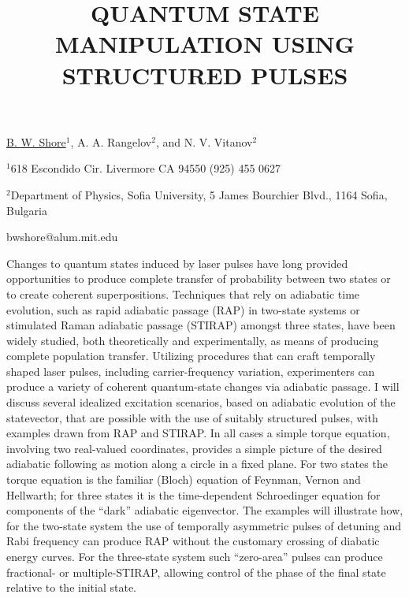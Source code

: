 \title{QUANTUM STATE MANIPULATION USING STRUCTURED PULSES}

\underline{B. W. Shore}$^1$, A. A. Rangelov$^2$, and N. V.
Vitanov$^{2}$   

{\normalsize{\vspace{-4mm} $^1$618 Escondido Cir. Livermore CA 94550 (925) 455
0627

\vspace{-4mm}  $^2$Department of Physics, Sofia University, 5 James
Bourchier Blvd., 1164 Sofia, Bulgaria

\email bwshore@alum.mit.edu}}

Changes to quantum states induced by laser pulses have long provided
opportunities to produce complete transfer of probability between two
states or to create coherent superpositions. Techniques that rely on
adiabatic time evolution, such as rapid adiabatic passage (RAP) in two-state
systems or stimulated Raman adiabatic passage (STIRAP)  amongst
three states, have been widely studied, both theoretically and
experimentally, as means of producing complete population transfer.
Utilizing procedures that can craft temporally shaped laser pulses,
including carrier-frequency variation,  experimenters can produce a
variety of coherent quantum-state changes via adiabatic passage.  I
will discuss several idealized excitation scenarios, based on
adiabatic evolution of the statevector,  that are possible with the
use of suitably structured pulses, with examples drawn from RAP and
STIRAP.  In all cases a simple torque equation, involving two real-valued
coordinates,  provides a simple picture of the desired
adiabatic following as motion along a circle in a fixed plane. For two
states the torque equation is the familiar (Bloch) equation of
Feynman, Vernon and Hellwarth; for three states it is the time-dependent
Schroedinger equation for components of the ``dark'' adiabatic
eigenvector.  The examples will illustrate how, for the two-state
system the use of temporally asymmetric pulses of detuning and Rabi
frequency can produce RAP without the customary crossing of diabatic
energy curves. For the three-state system such ``zero-area'' pulses can
produce fractional- or multiple-STIRAP, allowing control of the phase
of the final state relative to the initial state.

\vspace{\baselineskip}